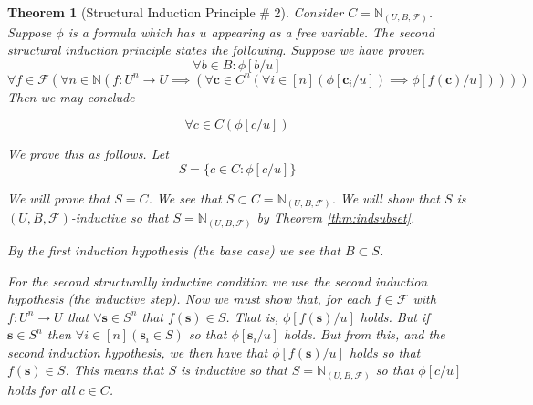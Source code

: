 \documentclass[12pt]{article}
\theoremstyle{break}
\theoremstyle{break}
\newtheorem{theorem}{Theorem}[section]
\theoremstyle{break}
\theoremstyle{break}
\theoremstyle{break}
\newtheorem{informal definition}[definition]{Informal Definition}
\newcommand{\bv}[1]{\boldsymbol{#1}}
\begin{document}
\begin{theorem}[Structural Induction Principle \# 2]
Consider $C = \mathbb{N}_{(U, B, \mathcal{F})}$.
Suppose $\phi$ is a formula which has $u$ appearing as a free variable.
The second structural induction principle states the following.
Suppose we have proven
$$
\forall b \in B: \phi[b/u]
$$
\small
$$
\forall f \in \mathcal{F}(\forall n \in \mathbb{N}(f:U^n \to U \implies (\forall \bv{c}\in C^n(\forall i \in [n](\phi[\bv{c}_i/u]) \implies \phi[f(\bv{c})/u]))))
$$
\normalsize
Then we may conclude

$$
\forall c \in C (\phi[c/u])
$$

We prove this as follows.
Let
$$
S = \{c \in C: \phi[c/u]\}
$$

We will prove that $S = C$.
We see that $S \subset C = \mathbb{N}_{(U, B, \mathcal{F})}$.
We will show that $S$ is $(U, B, \mathcal{F})$-inductive so that $S = \mathbb{N}_{(U, B, \mathcal{F})}$ by Theorem \ref{thm:indsubset}.

By the first induction hypothesis (the base case) we see that $B\subset S$.

For the second structurally inductive condition we use the second induction hypothesis (the inductive step).
Now we must show that, for each $f\in \mathcal{F}$ with $f:U^n \to U$ that $\forall \bv{s} \in S^n$ that $f(\bv{s})\in S$.
That is, $\phi[f(\bv{s})/u]$ holds.
But if $\bv{s}\in S^n$ then $\forall i \in [n] (\bv{s}_i \in S)$ so that $\phi[\bv{s}_i/u]$ holds.
But from this, and the second induction hypothesis, we then have that $\phi[f(\bv{s})/u]$ holds so that $f(\bv{s}) \in S$.
This means that $S$ is inductive so that $S = \mathbb{N}_{(U, B, \mathcal{F})}$ so that $\phi[c/u]$ holds for all $c \in C$.

\end{theorem}
\end{document}
